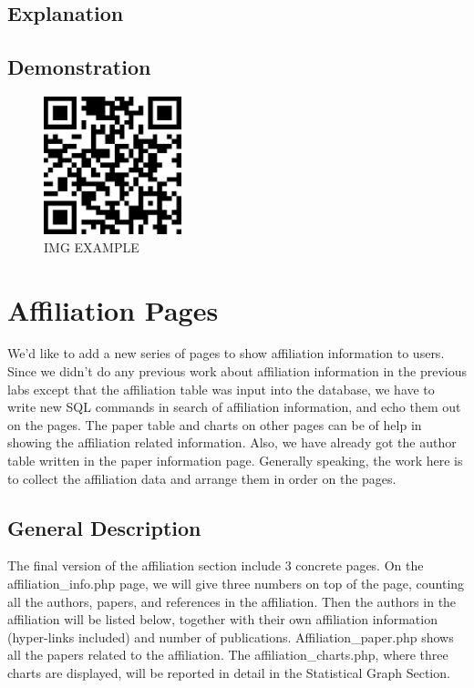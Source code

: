 \documentclass{book}
\begin{document}
\subsection{Explanation}

\subsection{Demonstration}

\begin{figure}[H]
\centering
\includegraphics[height=4.0cm,width=4.0cm]{img/yhb_1.jpg}
\caption{IMG EXAMPLE}
\end{figure}

\section {Affiliation Pages}

We'd like to add a new series of pages to show affiliation information to users. Since we didn't do any previous work about affiliation information in the previous labs except that the affiliation table was input into the database, we have to write new SQL commands in search of affiliation information, and echo them out on the pages. The paper table and charts on other pages can be of help in showing the affiliation related information. Also, we have already got the author table written in the paper information page. Generally speaking, the work here is to collect the affiliation data and arrange them in order on the pages.


\subsection {General Description}

The final version of the affiliation section include 3 concrete pages. On the affiliation\_info.php page, we will give three numbers on top of the page, counting all the authors, papers, and references in the affiliation. Then the authors in the affiliation will be listed below, together with their own affiliation information (hyper-links included) and number of publications. Affiliation\_paper.php shows all the papers related to the affiliation. The affiliation\_charts.php, where three charts are displayed, will be reported in detail in the Statistical Graph Section.
\end{document}
